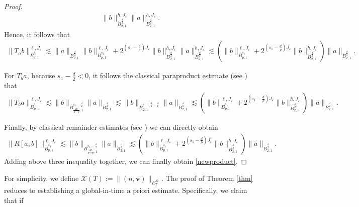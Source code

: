\documentclass{amsart}
\theoremstyle{definition}
\theoremstyle{remark}
\numberwithin{equation}{section}
\def\dB{{\dot {B}}}
\def\cX{{\mathcal X}}
\def\bv{{\bm{v} }}
\begin{document}
\begin{proof}
\begin{equation}
\begin{aligned}
\|b\|_{\dB_{2,1}^{\frac{d}{2}}}^{h,J_\varepsilon} \|a\|_{\dB_{2,1}^{\frac{d}{2}}}^{h,J_\varepsilon}.
\end{aligned}
\end{equation}
Hence, it follows that
\begin{equation}\nonumber
\begin{aligned}
\|T_{a} b\|_{\dB_{p,1}^{s_1}}^{\ell,J_\varepsilon} \lesssim \|a\|_{\dB_{2,1}^{\frac{d}{2}}}\|b\|_{\dB_{p,1}^{s_1}}^{\ell,J_\varepsilon}
+2^{(s_1-\frac{d}{p})J_\varepsilon}\|b\|_{\dB_{2,1}^{\frac{d}{2}}}^{h,J_\varepsilon} \|a\|_{\dB_{2,1}^{\frac{d}{2}}}^{h,J_\varepsilon}
\lesssim
\left(\|b\|_{\dB_{p,1}^{s_1}}^{\ell,J_\varepsilon}+ 2^{(s_1-\frac{d}{p})J_\varepsilon}\|b\|_{\dB_{2,1}^{\frac{d}{2}}}^{h,J_\varepsilon} \right)\|a\|_{\dB_{2,1}^{\frac{d}{2}}}.
\end{aligned}
\end{equation}

For $T_{b} a$, because $s_1-\frac{d}{2}<0$, it follows the classical paraproduct estimate (see \cite{Danchin}) that
\begin{equation}\nonumber
\begin{aligned}
\|T_{b} a\|_{\dB_{p,1}^{s_1}}^{\ell,J_\varepsilon}
\lesssim
\|b\|_{\dB_{\frac{2p}{2-p},1}^{s_1-\frac{d}{2}}}\|a\|_{\dB_{2,1}^{\frac{d}{2}}}
\lesssim
\|b\|_{\dB_{2,1}^{s_1+\frac{d}{2}-\frac{d}{p}}}\|a\|_{\dB_{2,1}^{\frac{d}{2}}}
\lesssim
\left(\|b\|_{\dB_{p,1}^{s_1}}^{\ell,J_\varepsilon}+ 2^{(s_1-\frac{d}{p})J_\varepsilon}\|b\|_{\dB_{2,1}^{\frac{d}{2}}}^{h,J_\varepsilon} \right)\|a\|_{\dB_{2,1}^{\frac{d}{2}}}.
\end{aligned}
\end{equation}

Finally, by classical remainder estimates (see \cite[Theorem 2.85]{chemin}) we can directly obtain
\begin{equation}\nonumber
\begin{aligned}
\|R[a,b]\|_{\dB_{p,1}^{s_1}}^{\ell,J_\varepsilon}
\lesssim
\|b\|_{\dB_{\frac{2p}{2-p},1}^{s_1-\frac{d}{2}}}\|a\|_{\dB_{2,1}^{\frac{d}{2}}}
\lesssim
\left(\|b\|_{\dB_{p,1}^{s_1}}^{\ell,J_\varepsilon}+ 2^{(s_1-\frac{d}{p})J_\varepsilon}\|b\|_{\dB_{2,1}^{\frac{d}{2}}}^{h,J_\varepsilon} \right)\|a\|_{\dB_{2,1}^{\frac{d}{2}}}.
\end{aligned}
\end{equation}
Adding above three inequality together, we can finally obtain \eqref{newproduct}.
\end{proof}
For simplicity, we define $\cX(T):=\|(n,\bv)\|_{E_T^{J\varepsilon}}$. The proof of Theorem \ref{thm} reduces to establishing a global-in-time a priori estimate. Specifically, we claim that if
\end{document}
